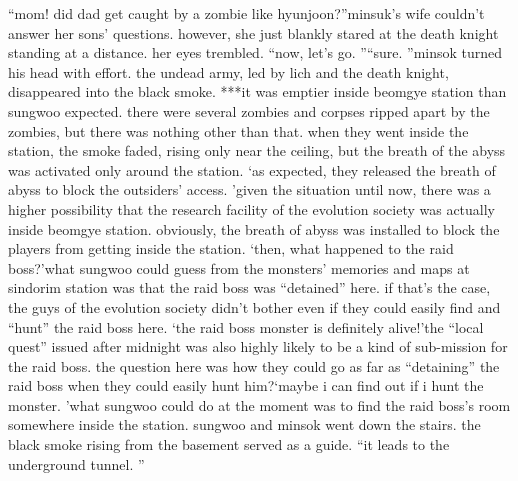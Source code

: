 “mom! did dad get caught by a zombie like hyunjoon?”minsuk’s wife couldn’t answer her sons’ questions.
 however, she just blankly stared at the death knight standing at a distance.
 her eyes trembled.
“now, let’s go.
”“sure.
”minsok turned his head with effort.
the undead army, led by lich and the death knight, disappeared into the black smoke.
***it was emptier inside beomgye station than sungwoo expected.
 there were several zombies and corpses ripped apart by the zombies, but there was nothing other than that.
when they went inside the station, the smoke faded, rising only near the ceiling, but the breath of the abyss was activated only around the station.
‘as expected, they released the breath of abyss to block the outsiders’ access.
’given the situation until now, there was a higher possibility that the research facility of the evolution society was actually inside beomgye station.
 obviously, the breath of abyss was installed to block the players from getting inside the station.
‘then, what happened to the raid boss?’what sungwoo could guess from the monsters’ memories and maps at sindorim station was that the raid boss was “detained” here.
if that’s the case, the guys of the evolution society didn’t bother even if they could easily find and “hunt” the raid boss here.
‘the raid boss monster is definitely alive!’the “local quest” issued after midnight was also highly likely to be a kind of sub-mission for the raid boss.
the question here was how they could go as far as “detaining” the raid boss when they could easily hunt him?‘maybe i can find out if i hunt the monster.
’what sungwoo could do at the moment was to find the raid boss’s room somewhere inside the station.
 sungwoo and minsok went down the stairs.
 the black smoke rising from the basement served as a guide.
“it leads to the underground tunnel.
”

 